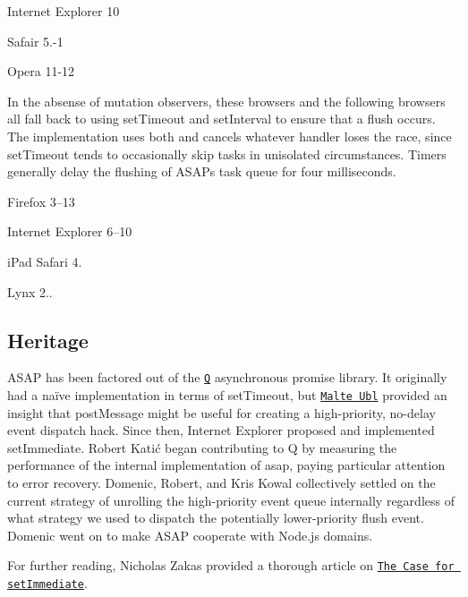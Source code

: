 \begin{DoxyItemize}
\item Internet Explorer 10
\item Safair 5.-\/1
\item Opera 11-\/12
\end{DoxyItemize}

In the absense of mutation observers, these browsers and the following browsers all fall back to using {\ttfamily set\+Timeout} and {\ttfamily set\+Interval} to ensure that a {\ttfamily flush} occurs. The implementation uses both and cancels whatever handler loses the race, since {\ttfamily set\+Timeout} tends to occasionally skip tasks in unisolated circumstances. Timers generally delay the flushing of A\+S\+AP\textquotesingle{}s task queue for four milliseconds.


\begin{DoxyItemize}
\item Firefox 3–13
\item Internet Explorer 6–10
\item i\+Pad Safari 4.
\item Lynx 2..
\end{DoxyItemize}

\subsection*{Heritage}

A\+S\+AP has been factored out of the \href{https://github.com/kriskowal/q}{\tt Q} asynchronous promise library. It originally had a naïve implementation in terms of {\ttfamily set\+Timeout}, but \href{http://www.nonblocking.io/2011/06/windownexttick.html}{\tt Malte Ubl} provided an insight that {\ttfamily post\+Message} might be useful for creating a high-\/priority, no-\/delay event dispatch hack. Since then, Internet Explorer proposed and implemented {\ttfamily set\+Immediate}. Robert Katić began contributing to Q by measuring the performance of the internal implementation of {\ttfamily asap}, paying particular attention to error recovery. Domenic, Robert, and Kris Kowal collectively settled on the current strategy of unrolling the high-\/priority event queue internally regardless of what strategy we used to dispatch the potentially lower-\/priority flush event. Domenic went on to make A\+S\+AP cooperate with Node.\+js domains.

For further reading, Nicholas Zakas provided a thorough article on \href{http://www.nczonline.net/blog/2013/07/09/the-case-for-setimmediate/}{\tt The Case for set\+Immediate}.

